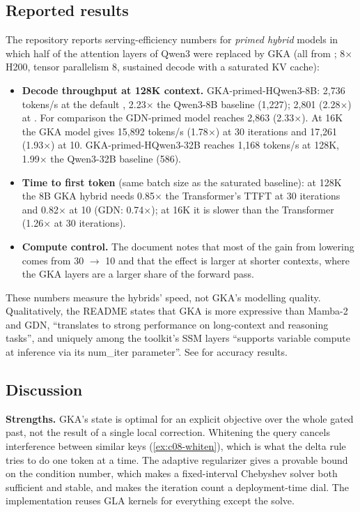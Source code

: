 \subsection{Reported results}

\begin{results}
The repository reports serving-efficiency numbers for \emph{primed hybrid} models in which half of
the attention layers of Qwen3 were replaced by GKA (all from
; 8$\times$H200, tensor parallelism
8, sustained decode with a saturated KV cache):
\begin{itemize}
  \item \textbf{Decode throughput at 128K context.} GKA-primed-HQwen3-8B: 2,736 tokens/s at the
  default , 2.23$\times$ the Qwen3-8B baseline (1,227); 2,801 (2.28$\times$) at
  . For comparison the GDN-primed model reaches 2,863 (2.33$\times$). At 16K the
  GKA model gives 15,892 tokens/s (1.78$\times$) at 30 iterations and 17,261 (1.93$\times$) at 10.
  GKA-primed-HQwen3-32B reaches 1,168 tokens/s at 128K, 1.99$\times$ the Qwen3-32B baseline (586).
  \item \textbf{Time to first token} (same batch size as the saturated baseline): at 128K the 8B GKA
  hybrid needs 0.85$\times$ the Transformer's TTFT at 30 iterations and 0.82$\times$ at 10 (GDN:
  0.74$\times$); at 16K it is slower than the Transformer (1.26$\times$ at 30 iterations).
  \item \textbf{Compute control.} The document notes that most of the gain from lowering
   comes from 30 $\rightarrow$ 10 and that the effect is larger at shorter contexts,
  where the GKA layers are a larger share of the forward pass.
\end{itemize}
These numbers measure the hybrids' speed, not GKA's modelling quality. Qualitatively, the README
states that GKA is more expressive than Mamba-2 and GDN, ``translates to strong performance on
long-context and reasoning tasks'', and uniquely among the toolkit's SSM layers ``supports variable
compute at inference via its num\_iter parameter''. See \citet{peng2026gka} for accuracy results.
\end{results}

\subsection{Discussion}

\textbf{Strengths.} GKA's state is optimal for an explicit objective over the whole gated past, not
the result of a single local correction. Whitening the query cancels interference between similar
keys (\cref{ex:c08-whiten}), which is what the delta rule tries to do one token at a time. The
adaptive regularizer gives a provable bound on the condition number, which makes a fixed-interval
Chebyshev solver both sufficient and stable, and makes the iteration count a deployment-time
dial. The implementation reuses GLA kernels for everything except the solve.

